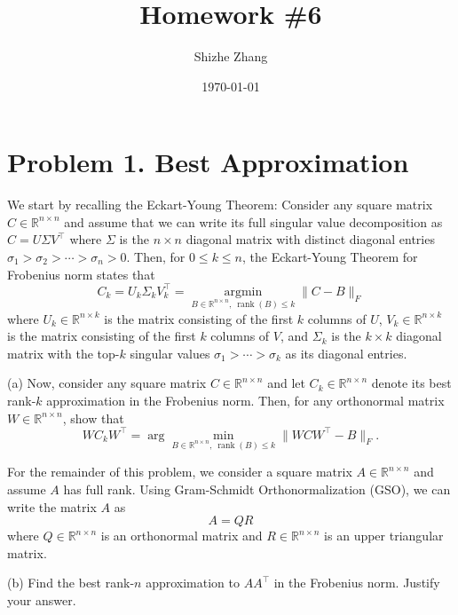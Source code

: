 \documentclass[
  12pt,
]{fphw}
\title{Homework \#6} %
\author{Shizhe Zhang} %
\date{\today} %
\institute{University of California, Berkeley \\ Department of Statistics} %
\begin{document}
\maketitle %


\section*{Problem 1. Best Approximation}
We start by recalling the Eckart-Young Theorem: Consider any square matrix $C \in \mathbb{R}^{n\times n}$ and assume that we
can write its full singular value decomposition as $C = U\Sigma V^\top$ where $\Sigma$ is the $n\times n$ diagonal matrix with distinct
diagonal entries $\sigma_1 > \sigma_2 > \cdots > \sigma_n > 0$. Then, for $0 \le k \le n$, the Eckart-Young Theorem for Frobenius
norm states that
\[
C_k = U_k \Sigma_k V_k^\top
= \underset{B \in \mathbb{R}^{n\times n}, \ \operatorname{rank}(B)\le k}{\operatorname{argmin}} \|C - B\|_F
\]
where $U_k \in \mathbb{R}^{n\times k}$ is the matrix consisting of the first $k$ columns of $U$, 
$V_k \in \mathbb{R}^{n\times k}$ is the matrix consisting of the first $k$ columns of $V$, 
and $\Sigma_k$ is the $k\times k$ diagonal matrix with the top-$k$ singular values 
$\sigma_1 > \cdots > \sigma_k$ as its diagonal entries.

(a) Now, consider any square matrix $C \in \mathbb{R}^{n\times n}$ and let $C_k \in \mathbb{R}^{n\times n}$ denote its best rank-$k$ approximation in
the Frobenius norm. Then, for any orthonormal matrix $W \in \mathbb{R}^{n\times n}$, show that
\[
W C_k W^\top
=
\arg\min_{B \in \mathbb{R}^{n\times n}, \ \operatorname{rank}(B)\le k}
\|W C W^\top - B\|_F .
\]

For the remainder of this problem, we consider a square matrix $A \in \mathbb{R}^{n\times n}$ and assume $A$ has full rank. Using
Gram-Schmidt Orthonormalization (GSO), we can write the matrix $A$ as
\[
A = QR \tag{1}
\]
where $Q \in \mathbb{R}^{n\times n}$ is an orthonormal matrix and $R \in \mathbb{R}^{n\times n}$ is an upper triangular matrix.

(b) Find the best rank-$n$ approximation to $AA^\top$ in the Frobenius norm. Justify your answer.
\end{document}

